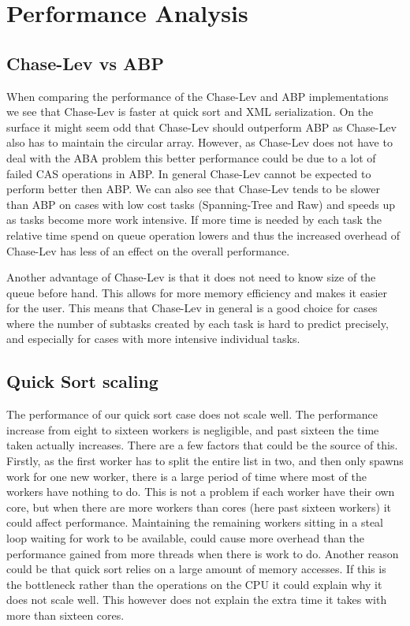 \section{Performance Analysis}
\label{sec:performance_analysis}
\subsection{Chase-Lev vs ABP}
When comparing the performance of the Chase-Lev and ABP implementations we see that Chase-Lev is faster at quick sort and XML serialization. On the surface it might seem odd that Chase-Lev should outperform ABP as Chase-Lev also has to maintain the circular array. However, as Chase-Lev does not have to deal with the ABA problem this better performance could be due to a lot of failed CAS operations in ABP. In general Chase-Lev cannot be expected to perform better then ABP. We can also see that Chase-Lev tends to be slower than ABP on cases with low cost tasks (Spanning-Tree and Raw) and speeds up as tasks become more work intensive. If more time is needed by each task the relative time spend on queue operation lowers and thus the increased overhead of Chase-Lev has less of an effect on the overall performance.

Another advantage of Chase-Lev is that it does not need to know size of the queue before hand. This allows for more memory efficiency and makes it easier for the user. This means that Chase-Lev in general is a good choice for cases where the number of subtasks created by each task is hard to predict precisely, and especially for cases with more intensive individual tasks.

\subsection{Quick Sort scaling}
The performance of our quick sort case does not scale well. The performance increase from eight to sixteen workers is negligible, and past sixteen the time taken actually increases. There are a few factors that could be the source of this. Firstly, as the first worker has to split the entire list in two, and then only spawns work for one new worker, there is a large period of time where most of the workers have nothing to do. This is not a problem if each worker have their own core, but when there are more workers than cores (here past sixteen workers) it could affect performance. Maintaining the remaining workers sitting in a steal loop waiting for work to be available, could cause more overhead than the performance gained from more threads when there is work to do. Another reason could be that quick sort relies on a large amount of memory accesses. If this is the bottleneck rather than the operations on the CPU it could explain why it does not scale well. This however does not explain the extra time it takes with more than sixteen cores.

